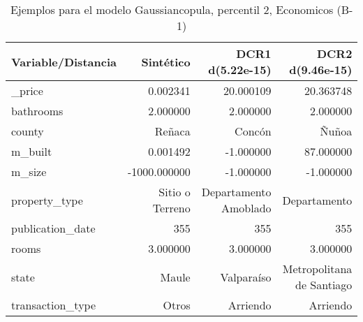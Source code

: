 \begin{table}[H]
\centering
\fontsize{10}{14}\selectfont
\caption{Ejemplos para el modelo Gaussiancopula, percentil 2, Economicos (B-1)}
\label{table-example-economicos-b-1-gaussiancopula-2p}
\begin{tabular}{|l|r|r|r|}
\hline
\rowcolor[gray]{0.8}
Variable/Distancia & Sintético & DCR1 d(5.22e-15) & DCR2 d(9.46e-15) \\
\hline \_price & \cellcolor[rgb]{0.9, 0.54, 0.52} 0.002341 & 20.000109 & 20.363748 \\
\hline bathrooms & \cellcolor[rgb]{0.9, 0.54, 0.52} 2.000000 & \cellcolor[rgb]{0.9, 0.54, 0.52} 2.000000 & \cellcolor[rgb]{0.9, 0.54, 0.52} 2.000000 \\
\hline county & \cellcolor[rgb]{0.9, 0.54, 0.52} Reñaca & Concón & Ñuñoa \\
\hline m\_built & \cellcolor[rgb]{0.9, 0.54, 0.52} 0.001492 & \cellcolor[rgb]{0.9, 0.54, 0.52} -1.000000 & 87.000000 \\
\hline m\_size & \cellcolor[rgb]{0.9, 0.54, 0.52} -1000.000000 & \cellcolor[rgb]{0.9, 0.54, 0.52} -1.000000 & \cellcolor[rgb]{0.9, 0.54, 0.52} -1.000000 \\
\hline property\_type & \cellcolor[rgb]{0.9, 0.54, 0.52} Sitio o Terreno & Departamento Amoblado & Departamento \\
\hline publication\_date & \cellcolor[rgb]{0.9, 0.54, 0.52} 355 & \cellcolor[rgb]{0.9, 0.54, 0.52} 355 & \cellcolor[rgb]{0.9, 0.54, 0.52} 355 \\
\hline rooms & \cellcolor[rgb]{0.9, 0.54, 0.52} 3.000000 & \cellcolor[rgb]{0.9, 0.54, 0.52} 3.000000 & \cellcolor[rgb]{0.9, 0.54, 0.52} 3.000000 \\
\hline state & \cellcolor[rgb]{0.9, 0.54, 0.52} Maule & Valparaíso & Metropolitana de Santiago \\
\hline transaction\_type & \cellcolor[rgb]{0.9, 0.54, 0.52} Otros & Arriendo & Arriendo \\
\hline
\end{tabular}
\end{table}
